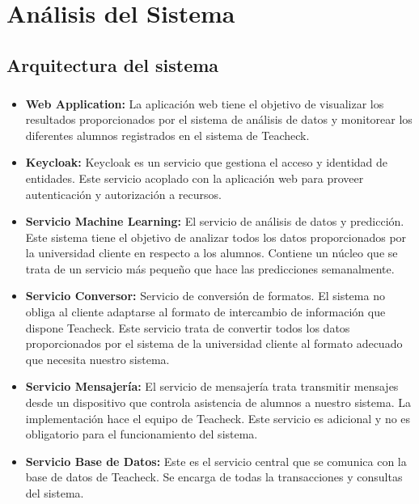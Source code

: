 \chapter{Análisis del Sistema}
\section{Arquitectura del sistema}
\paragraph{}
\begin{itemize}
  \item{\textbf{Web Application:}} La aplicación web tiene el objetivo
    de visualizar los resultados proporcionados por el sistema de
    análisis de datos y monitorear los diferentes alumnos registrados
    en el sistema de Teacheck.
  \item{\textbf{Keycloak:}} Keycloak es un servicio que gestiona el
    acceso y identidad de entidades. Este servicio acoplado con la
    aplicación web para proveer autenticación y autorización a
    recursos.
  \item{\textbf{Servicio Machine Learning:}} El servicio de análisis
    de datos y predicción. Este sistema tiene el objetivo de analizar
    todos los datos proporcionados por la universidad cliente en
    respecto a los alumnos. Contiene un núcleo que se trata de un
    servicio más pequeño que hace las predicciones semanalmente.
  \item{\textbf{Servicio Conversor:}} Servicio de conversión de
    formatos. El sistema no obliga al cliente adaptarse al formato de
    intercambio de información que dispone Teacheck. Este servicio
    trata de convertir todos los datos proporcionados por el sistema
    de la universidad cliente al formato adecuado que necesita nuestro
    sistema.
  \item{\textbf{Servicio Mensajería:}} El servicio de mensajería trata
    transmitir mensajes desde un dispositivo que controla asistencia
    de alumnos a nuestro sistema. La implementación hace el equipo de
    Teacheck. Este servicio es adicional y no es obligatorio para el
    funcionamiento del sistema.
  \item{\textbf{Servicio Base de Datos:}} Este es el servicio central
    que se comunica con la base de datos de Teacheck. Se encarga de
    todas la transacciones y consultas del sistema.
\end{itemize}
